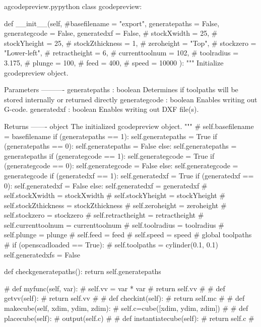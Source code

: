 \documentclass{ltxdoc}
\begin{document}
\lstset{firstnumber=\thegcpy}
\begin{writecode}{a}{gcodepreview.py}{python}
class gcodepreview:

    def __init__(self, #basefilename = "export", 
                 generatepaths = False, 
                 generategcode = False, 
                 generatedxf = False, 
#                 stockXwidth = 25, 
#                 stockYheight = 25, 
#                 stockZthickness = 1, 
#                 zeroheight = "Top", 
#                 stockzero = "Lower-left", 
#                 retractheight = 6, 
#                 currenttoolnum = 102, 
#                 toolradius = 3.175, 
#                 plunge = 100, 
#                 feed = 400, 
#                 speed = 10000
                  ):
        """
        Initialize gcodepreview object.
    
        Parameters
        ----------
        generatepaths : boolean
                        Determines if toolpaths will be stored internally or returned directly
        generategcode : boolean
                        Enables writing out G-code.
        generatedxf   : boolean
                        Enables writing out DXF file(s).
        
        Returns
        -------
        object
            The initialized gcodepreview object.
        """
#        self.basefilename = basefilename
        if (generatepaths == 1):
            self.generatepaths = True
        if (generatepaths == 0):
            self.generatepaths = False
        else:
            self.generatepaths = generatepaths
        if (generategcode == 1):
            self.generategcode = True
        if (generategcode == 0):
            self.generategcode = False
        else:
            self.generategcode = generategcode
        if (generatedxf == 1):
            self.generatedxf = True
        if (generatedxf == 0):
            self.generatedxf = False
        else:
            self.generatedxf = generatedxf
#        self.stockXwidth = stockXwidth
#        self.stockYheight = stockYheight
#        self.stockZthickness = stockZthickness
#        self.zeroheight = zeroheight
#        self.stockzero = stockzero
#        self.retractheight = retractheight
#        self.currenttoolnum = currenttoolnum
#        self.toolradius = toolradius
#        self.plunge = plunge
#        self.feed = feed
#        self.speed = speed
#        global toolpaths
#        if (openscadloaded == True):
#            self.toolpaths = cylinder(0.1, 0.1)
        self.generatedxfs = False
       
    def checkgeneratepaths():
        return self.generatepaths

#    def myfunc(self, var):
#        self.vv = var * var
#        return self.vv
#
#    def getvv(self):
#        return self.vv
#        
#    def checkint(self):
#        return self.mc
#
#    def makecube(self, xdim, ydim, zdim):
#        self.c=cube([xdim, ydim, zdim])
#        
#    def placecube(self):
#        output(self.c)
#
#    def instantiatecube(self):
#        return self.c
#
\end{writecode}
\addtocounter{gcpy}{82}
\end{document}
